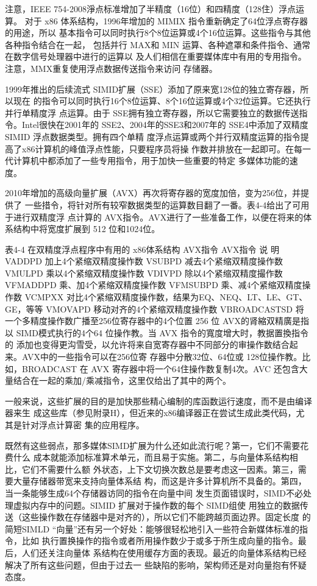  注意，IEEE 754-2008淨点标准增加了半精度（16位）和四精度（128住）浮点运算。
对于 x86 体系结构，1996年增加的 MIMIX 指令重新确定了64位浮点寄存器的用途，所以
基本指令可以同时执行8个8位运算或4个16位运算。这些指令与其他各种指令结合在一起，
包括并行 MAX和 MIN 运算、各种遮罩和条件指令、通常在数字信号处理器中进行的运算以
及人们相信在重要媒体库中有用的专用指令。注意，MMX重复使用浮点数据传送指令来访问
存储器。

1999年推出的后续流式 SIMID扩展（SSE）添加了原来宽128位的独立寄存器，所以现在
的指令可以同时执行16个8位运算、8个16位运算或4个32位运算。它还执行并行单精度浮
点运算。由于 SSE拥有独立寄存器，所以它需要独立的数据传送指令。Intel很快在2001年的
SSE2、2004年的SSE3和2007年的 SSE4中添加了双精度SIMID 浮点数据类型。拥有四个单精
度浮点运算或两个并行双精度运算的指令提高了x86计算机的峰值浮点性能，只要程序员将操
作数并排放在一起即可。在每一代计算机中都添加了一些专用指令，用于加快一些重要的特定
多媒体功能的速度。

2010年增加的高级向量扩展（AVX）再次将寄存器的宽度加倍，变为256位，并提供了
一些措令，将针对所有较窄数据类型的运算数目翻了一番。表4-4给出了可用于进行双精度浮
点计算的 AVX指令。AVX进行了一些准备工作，以便在将来的体系结构中将宽度扩展到 512
位和1024位。

表4-4 在双精度浮点程序中有用的 x86体系结构 AVX指令
AVX指令
说 明
VADDPD
加上4个紧缩双精度操怍数
VSUBPD
减去4个紧缩双精度操作数
VMULPD
乘以4个紧缩双精度操怍数
VDIVPD
除以4个紧缩双精度撮作数
VFMADDPD
乘、加4个紧缩双精度操作数
VFMSUBPD
乘、减4个紧缩双精度操作数
VCMPXX
对比4个紧缩双精度操作数，结果为EQ、NEQ、LT、LE、GT、GE，等等
VMOVAPD
移动对齐的4个紧缩双精度操作数
VBROADCASTSD
将一个多精度操作数广播至256位寄存器中的4个位置
 256 位 AVX的肾縮双精廣是指以 SIMD模式执行的4个64 位操作教。当 AVX 指令的寬度增大时，教据置換指令的
添加也变得更沟雪受，以允许将来自宽寄存器中不同部分的审操作数结合起来。AVX中的一些指令可以在256位寄
存器中分散32位、64位或 128位操作教。比如，BROADCAST 在 AVX 寄存器中将一个64住操作数复制4次。AVC
还包含大量结合在一起的乘加/乘减指令，这里仅给出了其中的两个。


一般来说，这些扩展的目的是加快那些精心编制的库函数运行速度，而不是由编译器来生
成这些库（参见附录H），但近来的x86编译器正在尝试生成此类代码，尤其是针对浮点计算密
集的应用程序。

既然有这些弱点，那多媒体SIMD扩展为什么还如此流行呢？第一，它们不需要花费什么
成本就能添加标准算术单元，而且易于实施。第二，与向量体系结构相比，它们不需要什么额
外状态，上下文切换次数总是要考虑这一因素。第三，需要大量存储器带宽来支持向量体系结
构，而这是许多计算机所不具备的。第四，当一条能够生成64个存储器访同的指令在向量中间
发生页面错误时，SIMD不必处理虚拟内存中的问题。SIMID 扩展对于操作数的每个 SIMD组使
用独立的数据传送（这些操作数在存储器中是对齐的），所以它们不能跨越页面边界。固定长度
的简短SIMLD “向量”还有另一个好处：能够很轻松地引入一些符合新媒体标准的指令，比如
执行置换操作的指令或者所用操作数少于或多于所生成向量的指令。最后，人们还关注向量体
系结构在使用缓存方面的表现。最近的向量体系结构已经解决了所有这些问题，但由于过去一
些缺陷的影响，架构师还是对向量抱有怀疑态度。

